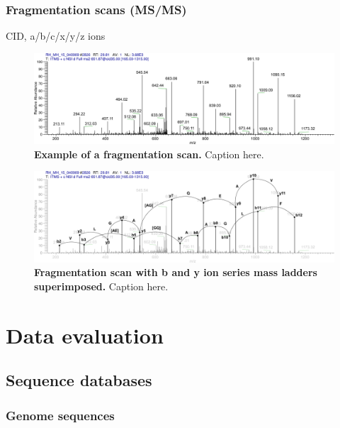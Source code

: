 \documentclass[11pt,a4paper,twoside]{report}
\begin{document}
\subsubsection{Fragmentation scans (MS/MS)}

\begin{todo}
CID, a/b/c/x/y/z ions
\end{todo}

\begin{figure}[h]
\includegraphics[width=\textwidth]{figures/ms2-scan.jpg}
\caption{
{\bf Example of a fragmentation scan.} 
Caption here.
}
\label{fig:fragmentation-scan}
\end{figure}

\begin{figure}[h]
\includegraphics[width=\textwidth]{figures/ms2-scan-b-y-1.jpg}
\caption{
{\bf Fragmentation scan with b and y ion series mass ladders superimposed.} 
Caption here.
}
\label{fig:fragmentation-scan-b-y}
\end{figure}


\section{Data evaluation}

\subsection{Sequence databases}

\subsubsection{Genome sequences}
\end{document}
